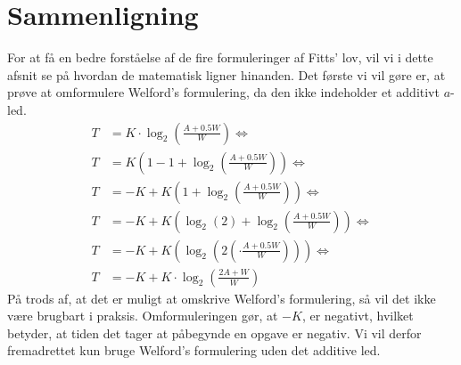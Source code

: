 \section*{Sammenligning}
For at få en bedre forståelse af de fire formuleringer af Fitts' lov, vil vi i dette afsnit se på hvordan de matematisk ligner hinanden. Det første vi vil gøre er, at prøve at omformulere Welford's formulering, da den ikke indeholder et additivt $a$-led. 
\begin{align*}
T &= K\cdot\log_2\left(\frac{A+0.5W}{W}\right)\Leftrightarrow\\
T &= K\left(1-1+\log_2\left(\frac{A+0.5W}{W}\right)\right)\Leftrightarrow\\
T &= -K+K\left(1+\log_2\left(\frac{A+0.5W}{W}\right)\right)\Leftrightarrow\\
T &= -K+K\left(\log_2(2)+\log_2\left(\frac{A+0.5W}{W}\right)\right)\Leftrightarrow\\
T &= -K+K\left(\log_2\left(2\left(\cdot\frac{A+0.5W}{W}\right)\right)\right)\Leftrightarrow\\
T &= -K+K\cdot\log_2\left(\frac{2A+W}{W}\right)
\end{align*}
På trods af, at det er muligt at omskrive Welford's formulering, så vil det ikke være brugbart i praksis. Omformuleringen gør, at $-K$, er negativt, hvilket betyder, at tiden det tager at påbegynde en opgave er negativ. Vi vil derfor fremadrettet kun bruge Welford's formulering uden det additive led.

